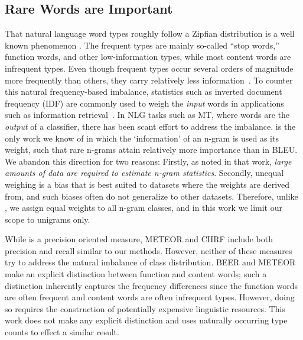     

\subsection{Rare Words are Important}
\label{sec:rare-words}
That natural language word types roughly follow a Zipfian distribution is a well known phenomenon \cite{zipf1949human,powers-1998-zipf-apps}.
The frequent types are mainly so-called ``stop words,'' function words, and other low-information types, while most content words are infrequent types.
Even though frequent types occur several orders of magnitude more frequently than others, they carry relatively less information~\cite{shannon1948mathematical}.
To counter this natural frequency-based imbalance, statistics such as inverted document frequency (IDF) are commonly used to weigh the \textit{input} words in applications such as information retrieval~\cite{Jones72specificity}.
In NLG tasks such as MT, where words are the \textit{output} of a classifier, there has been scant effort to address the imbalance.
\citet{doddington2002-nist} is the only work we know of in which the `information' of an n-gram is used as its weight, such that rare n-grams attain relatively more importance than in BLEU. 
We abandon this direction for two reasons:
Firstly, as noted in that work, \textit{large amounts of data are required to estimate n-gram statistics}.
Secondly, unequal weighing is a bias that is best suited to datasets where the weights are derived from, and such biases often do not generalize to other datasets.
Therefore, unlike \citet{doddington2002-nist}, we assign equal weights to all n-gram classes, and in this work we limit our scope to unigrams only.

While \bleu{} is a precision oriented measure, METEOR \cite{banerjee-lavie-2005-meteor} and CHRF \cite{popovic-2015-chrf} include both precision and recall similar to our methods.
However, neither of these measures try to address the natural imbalance of class distribution. 
BEER \cite{stanojevic-simaan-2014-beer} and METEOR \cite{denkowski-lavie-2011-meteor1.3} make an explicit distinction between function and content words; such a distinction inherently captures the frequency differences since the function words are often frequent and content words are often infrequent types. However, doing so requires the construction of potentially expensive linguistic resources. This work does not make any explicit  distinction and uses naturally occurring type counts to effect a similar result.

